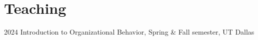 \documentclass[11pt,letterpaper]{report} %
\begin{document}














    \section*{Teaching}


    \begin{tablist}

        \item[2024] \tab{}Introduction to Organizational Behavior, Spring \& Fall semester, UT Dallas
        

    \end{tablist}
\end{document}
